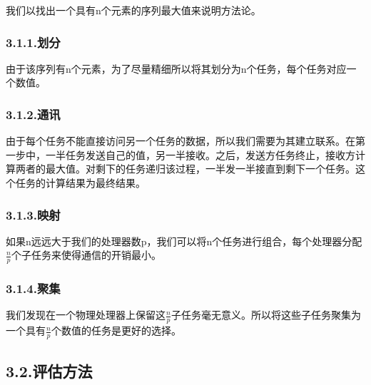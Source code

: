 \documentclass{article}
\begin{document}
\noindent{}我们以找出一个具有n个元素的序列最大值来说明方法论。%

\subsubsection{3.1.1.\hspace*{0.5em}划分}\label{section}%

\noindent{}由于该序列有n个元素，为了尽量精细所以将其划分为n个任务，每个任务对应一个数值。%

\subsubsection{3.1.2.\hspace*{0.5em}通讯}\label{section}%

\noindent{}由于每个任务不能直接访问另一个任务的数据，所以我们需要为其建立联系。在第一步中，一半任务发送自己的值，另一半接收。之后，发送方任务终止，接收方计算两者的最大值。对剩下的任务递归该过程，一半发一半接直到剩下一个任务。这个任务的计算结果为最终结果。%

\subsubsection{3.1.3.\hspace*{0.5em}映射}\label{section}%

\noindent{}如果n远远大于我们的处理器数p，我们可以将n个任务进行组合，每个处理器分配$\frac{n}{p}$个子任务来使得通信的开销最小。%

\subsubsection{3.1.4.\hspace*{0.5em}聚集}\label{section}%

\noindent{}我们发现在一个物理处理器上保留这$\frac{n}{p}$子任务毫无意义。所以将这些子任务聚集为一个具有$\frac{n}{p}$个数值的任务是更好的选择。%

\subsection{3.2.\hspace*{0.5em}评估方法}\label{section}%
\end{document}
